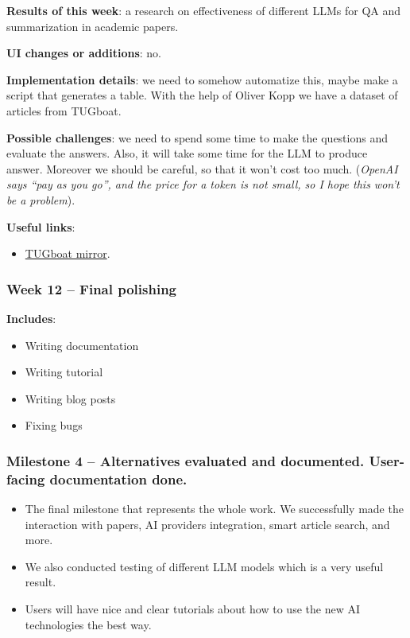 \documentclass{article}
\begin{document}
	\textbf{Results of this week}: a research on effectiveness of different LLMs for QA and summarization in academic papers.
	
	\textbf{UI changes or additions}: no.
	
	\textbf{Implementation details}: we need to somehow automatize this, maybe make a script that generates a table. With the help of Oliver Kopp we have a dataset of articles from TUGboat.
	
	\textbf{Possible challenges}: we need to spend some time to make the questions and evaluate the answers. Also, it will take some time for the LLM to produce answer. Moreover we should be careful, so that it won't cost too much. (\textit{OpenAI says \enquote{pay as you go}, and the price for a token is not small, so I hope this won't be a problem}).
	
	\textbf{Useful links}:
	\begin{itemize}
		\item \href{https://github.com/koppor/tugboat-mirror}{TUGboat mirror}.
	\end{itemize}
	
	\subsubsection{Week 12 -- Final polishing}
	\textbf{Includes}:
	\begin{itemize}
		\item Writing documentation
		\item Writing tutorial
		\item Writing blog posts
		\item Fixing bugs
	\end{itemize}
	
	\subsubsection{Milestone 4 -- Alternatives evaluated and documented. User-facing documentation done.}
	\begin{itemize}
		\item The final milestone that represents the whole work. We successfully made the interaction with papers, AI providers integration, smart article search, and more.
		\item We also conducted testing of different LLM models which is a very useful result.
		\item Users will have nice and clear tutorials about how to use the new AI technologies the best way.
	\end{itemize}
\end{document}
